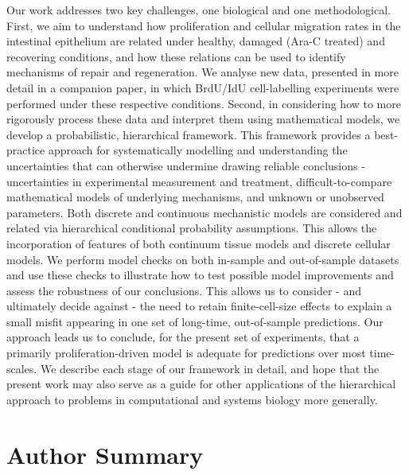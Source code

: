 \documentclass[10pt,letterpaper]{article}
\begin{document}
Our work addresses two key challenges, one biological and one
methodological. First, we aim to understand how proliferation and
cellular migration rates in the intestinal epithelium are related under
healthy, damaged (Ara-C treated) and recovering conditions, and how
these relations can be used to identify mechanisms of repair and
regeneration. We analyse new data, presented in more detail in a
companion paper, in which BrdU/IdU cell-labelling experiments were
performed under these respective conditions. Second, in considering how
to more rigorously process these data and interpret them using
mathematical models, we develop a probabilistic, hierarchical framework.
This framework provides a best-practice approach for systematically
modelling and understanding the uncertainties that can otherwise
undermine drawing reliable conclusions - uncertainties in experimental
measurement and treatment, difficult-to-compare mathematical models of
underlying mechanisms, and unknown or unobserved parameters. Both
discrete and continuous mechanistic models are considered and related
via hierarchical conditional probability assumptions. This allows the
incorporation of features of both continuum tissue models and discrete
cellular models. We perform model checks on both in-sample and
out-of-sample datasets and use these checks to illustrate how to test
possible model improvements and assess the robustness of our
conclusions. This allows us to consider - and ultimately decide against
- the need to retain finite-cell-size effects to explain a small misfit
appearing in one set of long-time, out-of-sample predictions. Our
approach leads us to conclude, for the present set of experiments, that
a primarily proliferation-driven model is adequate for predictions over
most time-scales. We describe each stage of our framework in detail, and
hope that the present work may also serve as a guide for other
applications of the hierarchical approach to problems in computational
and systems biology more generally.

\section{Author Summary}\label{author-summary}
\end{document}
